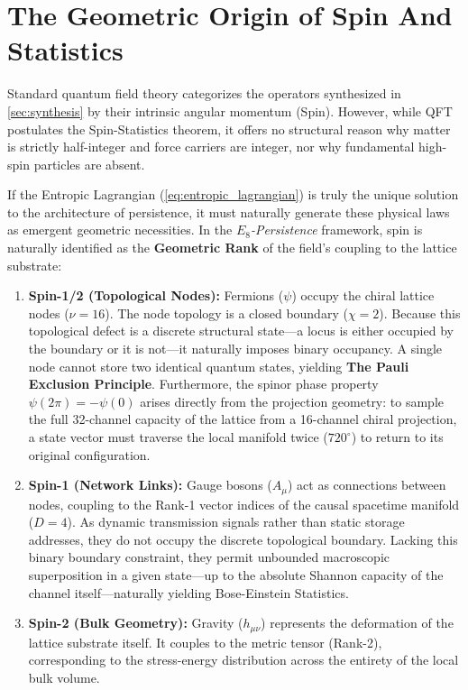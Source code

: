 \section{The Geometric Origin of Spin And Statistics}
\label{sec:spin_validation}

Standard quantum field theory categorizes the operators synthesized in \cref{sec:synthesis} by their intrinsic angular momentum (Spin). However, while QFT postulates the Spin-Statistics theorem, it offers no structural reason why matter is strictly half-integer and force carriers are integer, nor why fundamental high-spin particles are absent.

If the Entropic Lagrangian (\cref{eq:entropic_lagrangian}) is truly the unique solution to the architecture of persistence, it must naturally generate these physical laws as emergent geometric necessities. In the \textit{$E_8$-Persistence} framework, spin is naturally identified as the \textbf{Geometric Rank} of the field's coupling to the lattice substrate:

\begin{enumerate}
    \item \textbf{Spin-1/2 (Topological Nodes):} Fermions ($\psi$) occupy the chiral lattice nodes ($\nu=16$). The node topology is a closed boundary ($\chi=2$). Because this topological defect is a discrete structural state---a locus is either occupied by the boundary or it is not---it naturally imposes binary occupancy. A single node cannot store two identical quantum states, yielding \textbf{The Pauli Exclusion Principle}. Furthermore, the spinor phase property $\psi(2\pi) = -\psi(0)$ arises directly from the projection geometry: to sample the full 32-channel capacity of the lattice from a 16-channel chiral projection, a state vector must traverse the local manifold twice ($720^\circ$) to return to its original configuration.
    
    \item \textbf{Spin-1 (Network Links):} Gauge bosons ($A_\mu$) act as connections between nodes, coupling to the Rank-1 vector indices of the causal spacetime manifold ($D=4$). As dynamic transmission signals rather than static storage addresses, they do not occupy the discrete topological boundary. Lacking this binary boundary constraint, they permit unbounded macroscopic superposition in a given state—up to the absolute Shannon capacity of the channel itself—naturally yielding Bose-Einstein Statistics.
    
    \item \textbf{Spin-2 (Bulk Geometry):} Gravity ($h_{\mu\nu}$) represents the deformation of the lattice substrate itself. It couples to the metric tensor (Rank-2), corresponding to the stress-energy distribution across the entirety of the local bulk volume. 
\end{enumerate}
